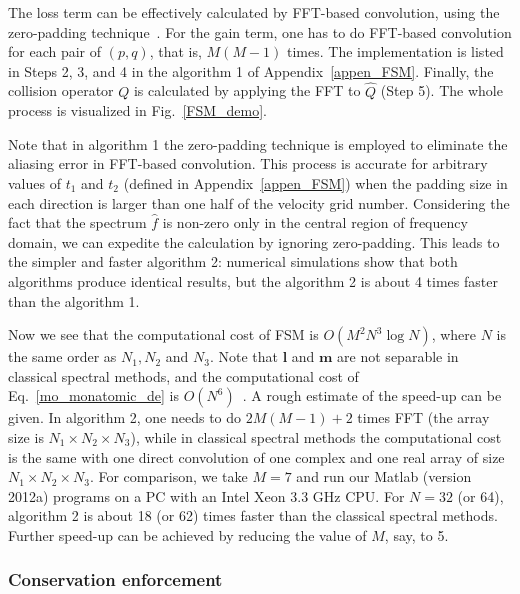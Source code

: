 The loss term can be effectively calculated by FFT-based convolution, using the zero-padding technique~\cite{Canuto1998}. For the gain term, one has to do FFT-based convolution for each pair of $(p,q)$, that is, $M(M-1)$ times. The implementation is listed in Steps 2, 3, and 4 in the algorithm 1 of Appendix~\ref{appen_FSM}. Finally, the collision operator $Q$ is calculated by applying the FFT to $\widehat{Q}$ (Step 5). The whole process is visualized in Fig.~\ref{FSM_demo}.

Note that in algorithm 1 the zero-padding technique is employed to eliminate the aliasing error in FFT-based convolution. This process is accurate for arbitrary values of $t_1$ and $t_2$ (defined in Appendix~\ref{appen_FSM}) when the padding size in each direction is larger than one half of the velocity grid number. Considering the fact that the spectrum $\hat{f}$ is non-zero only in the central region of frequency domain, we can expedite the calculation by ignoring zero-padding. This leads to the simpler and faster algorithm 2: numerical simulations show that both algorithms produce identical results, but the algorithm 2 is about 4 times faster than the algorithm 1.


Now we see that the computational cost of FSM is $O(M^2N^3\log{}N)$, where $N$ is the same order as $N_1,N_2$ and $N_3$. Note that $\bm{l}$ and $\bm{m}$ are not separable in classical spectral methods, and the computational cost of Eq.~\eqref{mo_monatomic_de} is $O(N^6)$~\cite{Gamba2009,Pareschi2000}. A rough estimate of the speed-up can be given. In algorithm 2, one needs to do $2M(M-1)+2$ times FFT (the array size is $N_1\times{N_2}\times{N_3}$), while in classical spectral methods the computational cost is the same with one direct convolution of one complex and one real array of size $N_1\times{N_2}\times{N_3}$. For comparison, we take $M=7$ and run our Matlab (version 2012a) programs on a PC with an Intel Xeon 3.3 GHz CPU. For $N=32$ (or 64), algorithm 2 is about 18 (or 62) times faster than the classical spectral methods. Further speed-up can be achieved by reducing the value of $M$, say, to 5. 



\subsubsection{Conservation enforcement}%

